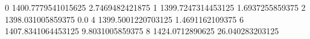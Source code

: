 0 1400.7779541015625 2.7469482421875
1 1399.7247314453125 1.6937255859375
2 1398.031005859375 0.0
4 1399.5001220703125 1.4691162109375
6 1407.8341064453125 9.8031005859375
8 1424.0712890625 26.040283203125
